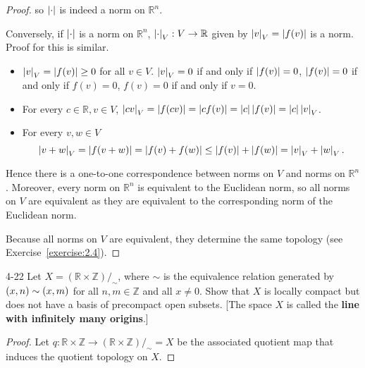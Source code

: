 \begin{proof}
	so $\left\vert{\cdot}\right\vert$ is indeed a norm on $\mathbb{R}^{n}$.

	Conversely, if $\left\vert{\cdot}\right\vert$ is a norm on $\mathbb{R}^{n}$, $\left\vert{\cdot}\right\vert_{V}: V\to \mathbb{R}$ given by $\left\vert{v}\right\vert_{V} = \left\vert{f(v)}\right\vert$ is a norm. Proof for this is similar.
	\begin{itemize}
		\item $\left\vert{v}\right\vert_{V} = \left\vert{f(v)}\right\vert \geq 0$ for all $v\in V$. $\left\vert{v}\right\vert_{V} = 0$ if and only if $\left\vert{f(v)}\right\vert = 0$, $\left\vert{f(v)}\right\vert = 0$ if and only if $f(v) = 0$, $f(v) = 0$ if and only if $v = 0$.
		\item For every $c\in \mathbb{R}, v\in V$, $\left\vert{cv}\right\vert_{V} = \left\vert{f(cv)}\right\vert = \left\vert{cf(v)}\right\vert = \left\vert{c}\right\vert\left\vert{f(v)}\right\vert = \left\vert{c}\right\vert\left\vert{v}\right\vert_{V}$.
		\item For every $v, w\in V$
		      \begin{equation*}
			      \left\vert{v + w}\right\vert_{V} = \left\vert{f(v + w)}\right\vert = \left\vert{f(v) + f(w)}\right\vert \leq \left\vert{f(v)}\right\vert + \left\vert{f(w)}\right\vert = \left\vert{v}\right\vert_{V} + \left\vert{w}\right\vert_{V}.
		      \end{equation*}
	\end{itemize}

	Hence there is a one-to-one correspondence between norms on $V$ and norms on $\mathbb{R}^{n}$. Moreover, every norm on $\mathbb{R}^{n}$ is equivalent to the Euclidean norm, so all norms on $V$ are equivalent as they are equivalent to the corresponding norm of the Euclidean norm.

	Because all norms on $V$ are equivalent, they determine the same topology (see Exercise~\ref{exercise:2.4}).
\end{proof}

\begin{problem}{4-22}
Let $X = (\mathbb{R} \times \mathbb{Z})/_{\sim}$, where $\sim$ is the equivalence relation generated by $\left({x, n}\right) \sim \left({x, m}\right)$ for all $n, m \in \mathbb{Z}$ and all $x \ne 0$. Show that $X$ is locally compact but does not have a basis of precompact open subsets. [The space $X$ is called the \textbf{line with infinitely many origins}.]
\end{problem}

\begin{proof}
	Let $q: \mathbb{R}\times \mathbb{Z} \to (\mathbb{R}\times \mathbb{Z})/_{\sim} = X$ be the associated quotient map that induces the quotient topology on $X$.
\end{proof}

